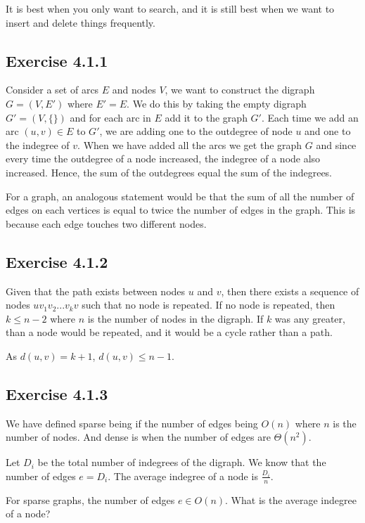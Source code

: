 \documentclass{article}
\begin{document}
It is best when you only want to search, and it is still best when we want to insert and delete things frequently.


\subsection*{Exercise 4.1.1}

Consider a set of arcs \(E\) and nodes \(V\), we want to construct the digraph \(G=(V,E')\) where \(E'=E\). We do this by taking the empty digraph \(G'=(V,\{\})\) and for each arc in \(E\) add it to the graph \(G'\). Each time we add an arc \((u,v) \in E\) to \(G'\), we are adding one to the outdegree of node \(u\) and one to the indegree of \(v\). When we have added all the arcs we get the graph \(G\) and since every time the outdegree of a node increased, the indegree of a node also increased. Hence, the sum of the outdegrees equal the sum of the indegrees.

For a graph, an analogous statement would be that the sum of all the number of edges on each vertices is equal to twice the number of edges in the graph. This is because each edge touches two different nodes.


\subsection*{Exercise 4.1.2}

Given that the path exists between nodes \(u\) and \(v\), then there exists a sequence of nodes \(uv_1v_2...v_kv\) such that no node is repeated. If no node is repeated, then \(k \leq n-2\) where \(n\) is the number of nodes in the digraph. If \(k\) was any greater, than a node would be repeated, and it would be a cycle rather than a path.

As \(d(u,v) = k+1\), \(d(u,v) \leq n-1\).


\subsection*{Exercise 4.1.3}

We have defined sparse being if the number of edges being \(O(n)\) where \(n\) is the number of nodes. And dense is when the number of edges are \(\Theta(n^2)\).

Let \(D_i\) be the total number of indegrees of the digraph. We know that the number of edges \(e = D_i\). The average indegree of a node is \(\frac{D_i}{n}\).

For sparse graphs, the number of edges \(e \in O(n)\). What is the average indegree of a node?
\end{document}
